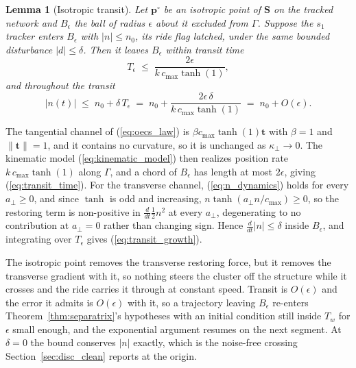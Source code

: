 \documentclass[lettersize,journal]{IEEEtran}
\newtheorem{lemma}{Lemma}
\begin{document}
\begin{lemma}[Isotropic transit]
\label{lem:transit}
Let $\mathbf{p}^\circ$ be an isotropic point of $\mathbf{S}$ on the
tracked network and $B_\epsilon$ the ball of radius $\epsilon$ about it
excluded from $\Gamma$. Suppose the $s_1$ tracker enters $B_\epsilon$
with $|n| \leq n_0$, its ride flag latched, under the same bounded
disturbance $|d| \leq \delta$. Then it leaves $B_\epsilon$ within
transit time
\begin{equation}
    T_\epsilon \;\leq\; \frac{2\epsilon}{k\,c_{\max}\tanh(1)},
    \label{eq:transit_time}
\end{equation}
and throughout the transit
\begin{equation}
    |n(t)| \;\leq\; n_0 + \delta\,T_\epsilon
    \;=\; n_0 + \frac{2\epsilon\,\delta}{k\,c_{\max}\tanh(1)}
    \;=\; n_0 + O(\epsilon).
    \label{eq:transit_growth}
\end{equation}
\end{lemma}

\begin{IEEEproof}
The tangential channel of (\ref{eq:oecs_law}) is
$\beta c_{\max}\tanh(1)\mathbf{t}$ with $\beta = 1$ and
$\lVert\mathbf{t}\rVert = 1$, and it contains no curvature, so it is
unchanged as $\kappa_\perp \to 0$. The kinematic model
(\ref{eq:kinematic_model}) then realizes position rate
$k\,c_{\max}\tanh(1)$ along $\Gamma$, and a chord of $B_\epsilon$ has
length at most $2\epsilon$, giving (\ref{eq:transit_time}).
For the transverse channel, (\ref{eq:n_dynamics}) holds for every
$a_\perp \geq 0$, and since $\tanh$ is odd and increasing,
$n\tanh(a_\perp n/c_{\max}) \geq 0$, so the restoring term is
non-positive in $\tfrac{d}{dt}\tfrac{1}{2}n^2$ at every $a_\perp$,
degenerating to no contribution at $a_\perp = 0$ rather than changing
sign. Hence $\tfrac{d}{dt}|n| \leq \delta$ inside $B_\epsilon$, and
integrating over $T_\epsilon$ gives (\ref{eq:transit_growth}).
\end{IEEEproof}

The isotropic point removes the transverse restoring force, but it
removes the transverse gradient with it, so nothing steers the cluster
off the structure while it crosses and the ride carries it through at
constant speed. Transit is $O(\epsilon)$ and the error it admits is
$O(\epsilon)$ with it, so a trajectory leaving $B_\epsilon$ re-enters
Theorem~\ref{thm:separatrix}'s hypotheses with an initial condition
still inside $T_w$ for $\epsilon$ small enough, and the exponential
argument resumes on the next segment. At $\delta = 0$ the bound
conserves $|n|$ exactly, which is the noise-free crossing
Section~\ref{sec:disc_clean} reports at the origin.
\end{document}
